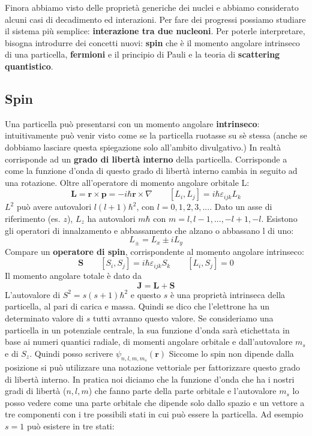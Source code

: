 Finora abbiamo visto delle proprietà generiche dei nuclei e abbiamo considerato alcuni casi di decadimento ed interazioni. Per fare dei progressi possiamo studiare il sistema più semplice: \textbf{interazione tra due nucleoni}. Per poterle interpretare, bisogna introdurre dei concetti nuovi: \textbf{spin} che è il momento angolare intrinseco di una particella, \textbf{fermioni} e il principio di Pauli e la teoria di \textbf{scattering quantistico}.
\subsection{Spin}
Una particella può presentarsi con un momento angolare \textbf{intrinseco}: intuitivamente può venir visto come se la particella ruotasse su sè stessa (anche se dobbiamo lasciare questa spiegazione solo all'ambito divulgativo.) In realtà corrisponde ad un \textbf{grado di libertà interno} della particella. Corrisponde a come la funzione d'onda di questo grado di libertà interno cambia in seguito ad una rotazione. Oltre all'operatore di momento angolare orbitale L:
\begin{equation*}
    \mathbf{L}=\mathbf{r}\times\mathbf{p}=-i\hbar\mathbf{r}\times \nabla \qquad [L_i,L_j]=i\hbar\varepsilon_{ijk}L_k
\end{equation*}
$L^2$ può avere autovalori $l(l+1)\hbar^2$, con $l=0,1,2,3,...$. Dato un asse di riferimento (es. $z$), $L_z$ ha autovalori $m\hbar$ con $m=l,l-1,...,-l+1,-l$. Esistono gli operatori di innalzamento e abbassamento che alzano o abbassano l di uno:
\begin{equation*}
    L_\pm=L_x\pm iL_y
\end{equation*}
Compare un \textbf{operatore di spin}, corrispondente al momento angolare intrinseco:
\begin{equation*}
    \mathbf{S}\qquad [S_i,S_j]=i\hbar\varepsilon_{ijk}S_k \qquad [L_i,S_j]=0
\end{equation*}
Il momento angolare totale è dato da 
\begin{equation*}
    \mathbf{J}=\mathbf{L}+\mathbf{S}
\end{equation*}
L'autovalore di $S^2=s(s+1)\hbar^2$ e questo $s$ è una proprietà intrinseca della particella, al pari di carica e massa. Quindi se dico che l'elettrone ha un determinato valore di $s$ tutti avranno questo valore. Se consideriamo una particella in un potenziale centrale, la sua funzione d'onda sarà etichettata in base ai numeri quantici radiale, di momenti angolare orbitale e dall'autovalore $m_s$ e di $S_z$. Quindi posso scrivere $\psi_{n,l,m,m_s}(\mathbf{r})$ Siccome lo spin non dipende dalla posizione si può utilizzare una notazione vettoriale per fattorizzare questo grado di libertà interno. In pratica noi diciamo che la funzione d'onda che ha i nostri gradi di libertà ($n,l,m$) che fanno parte della parte orbitale e l'autovalore $m_s$ lo posso vedere come una parte orbitale che dipende solo dallo spazio e un vettore a tre componenti con i tre possibili stati in cui può essere la particella. Ad esempio $s=1$ può esistere in tre stati:
